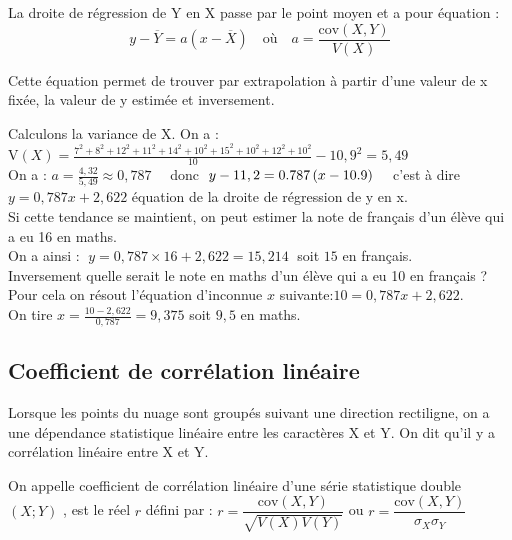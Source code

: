 \medskip
\begin{property}
 La droite de régression de Y en X passe par le
point moyen et a pour équation : 
$$ y-\overline{Y}=a(x-\overline{X})\quad \text{où} \quad  a=\frac{\text{cov}(X,Y)}{V(X)} $$
\end{property}
\begin{remark}
Cette équation permet de trouver par extrapolation à partir d'une valeur de x fixée,
la valeur de y estimée  et inversement.
\end{remark}

\begin{example} Calculons la variance de X. On a :\\ V$ (X)=\frac{7^{2}+ 8^{2} + 12^{2}+  11^{2} +14^{2}  +10^{2} + 15^{2} + 10^{2}  +12^{2} + 10^{2}}{10}-10,9^{2} =5,49$\\
 On a : $ a= \frac{4,32}{5,49}\approx 0,787 \quad $     donc   $\; y-11,2=0.787\left(x-10.9\right) \quad $  c'est à dire $ y= 0,787x+2,622$ équation de la droite de régression de y en x.\\ Si cette tendance se maintient, on peut estimer la note de français d'un élève qui a eu 16 en maths.\\
 On a ainsi : $\; y=0,787\times16+2,622=15,214 \;$  soit $ 15 $ en français.\\
 Inversement quelle serait le note en maths  d'un élève qui a  eu 10 en français ?\\
Pour cela  on résout l'équation d'inconnue $ x $ suivante:\;$ 10= 0,787x+2,622$.\\
 On tire $ x=\frac{10-2,622}{0,787}=9,375 $ soit $ 9,5 $  en maths.
\end{example}
\subsection*{Coefficient de corrélation linéaire}
Lorsque les points du nuage sont groupés suivant
une direction rectiligne, on a une dépendance
statistique linéaire entre les caractères X et Y. On
dit qu'il y a corrélation linéaire entre X et Y.

\begin{definition}
 On appelle coefficient de corrélation linéaire d'une série statistique double $(X ;Y)$ , est le réel $ r $\; défini
par : \; $ r=\dfrac{\text{cov}(X,Y)}{\sqrt{V(X)V(Y)}}  $ \quad ou \; $ r=\dfrac{\text{cov}(X,Y)}{\sigma_{X}\sigma_{Y}}  $

 \end{definition}
 \medskip
 
